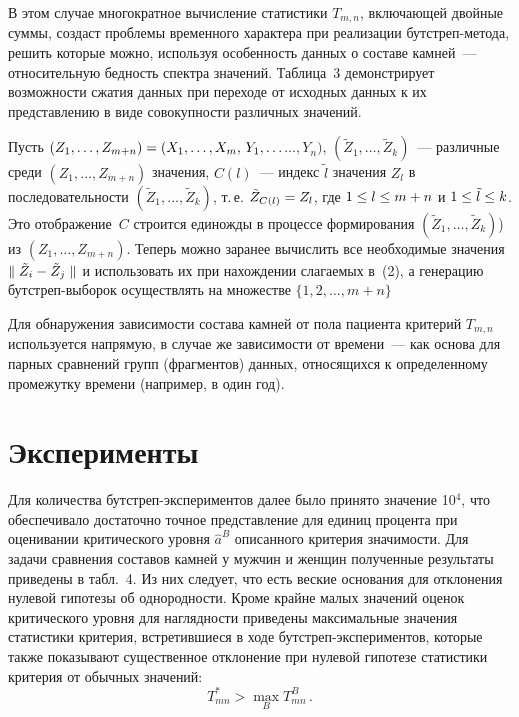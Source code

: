 \begin{multicols}{2}
      В этом случае многократное вычисление статистики $T_{m,n}$, включающей 
двойные суммы, создаст проблемы временного характера при реализации 
      бут\-стреп-ме\-то\-да, решить которые можно, используя особенность данных о 
составе камней~--- относительную бедность спектра значений. Таблица~3 демонстрирует 
возможности сжатия данных при переходе от исходных данных к их представлению в виде 
совокупности различных значений.
      
      Пусть $(Z_1,\ldots, Z_{m+n})\hm= (X_1,\ldots , X_m,\,Y_1,\ldots$\linebreak $\ldots , Y_n)$, 
$(\tilde{Z}_1,\ldots ,\tilde{Z}_k)$~--- различные среди $(Z_1,\ldots ,Z_{m+n})$ значения, 
$C(l)$~--- индекс $\tilde{l}$ значения $Z_l$ в последовательности $(\tilde{Z}_1,\ldots 
,\tilde{Z}_k)$, т.\,е. $\tilde{Z}_{C(l)} \hm= Z_l$, где $1\hm\leq l\hm\leq m\hm+n$ и $1\hm\leq 
\tilde{l}\hm\leq k$. Это отоб\-ра\-же\-ние~$C$ строится единожды в процессе формирования 
$(\tilde{Z}_1,\ldots ,\tilde{Z}_k)$) из $(Z_1,\ldots , Z_{m+n})$. Теперь можно заранее 
вычислить все необходимые значения $\parallel \tilde{Z}_i\hm- \tilde{Z}_j\parallel$ и 
использовать их при нахождении слагаемых в~(2), а генерацию бут\-стреп-вы\-бо\-рок 
осуществлять на множестве $\{ 1, 2, \ldots , m+n\}$
      
      Для обнаружения зависимости состава камней от пола пациента критерий $T_{m,n}$ 
используется напрямую, в случае же зависимости от времени~--- как основа для парных 
сравнений групп (фрагментов) данных, относящихся к определенному промежутку времени 
(например, в один год). 
      
\section{Эксперименты}

      Для количества бут\-стреп-экспе\-ри\-мен\-тов далее было принято значение 10$^4$, 
что обеспечивало достаточно точное представление для единиц процента при оценивании 
критического уровня $\hat{a}^B$ описанного критерия значимости. Для задачи сравнения 
составов камней у мужчин и женщин полученные результаты приведены в табл.~4. Из них 
следует, что есть веские основания для отклонения нулевой гипотезы об однородности. 
Кроме крайне малых значений оценок критического уровня для наглядности приведены 
максимальные значения статистики критерия, встретившиеся в ходе 
      бут\-стреп-экспе\-ри\-мен\-тов, которые также показывают существенное отклонение 
при нулевой гипотезе статистики критерия от обычных значений:
      $$
      T^*_{mn}>\max\limits_B T^B_{mn}\,.
      $$
      



\end{multicols}
